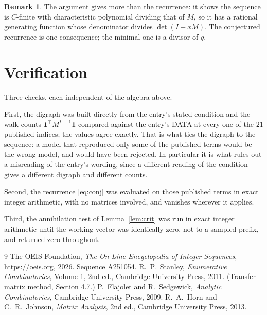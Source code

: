 \documentclass[11pt,a4paper]{article}
\theoremstyle{plain}
\theoremstyle{definition}
\newtheorem{remark}[theorem]{Remark}
\begin{document}
\begin{remark}
The argument gives more than the recurrence: it shows the sequence is $C$-finite with
characteristic polynomial dividing that of $M$, so it has a rational generating function
whose denominator divides $\det(I-xM)$. The conjectured recurrence is one consequence; the
minimal one is a divisor of $q$.
\end{remark}

\section{Verification}

Three checks, each independent of the algebra above.

First, the digraph was built directly from the entry's stated condition and the walk counts
$\mathbf{1}^{\!\top}M^{L-1}\mathbf{1}$ compared against the entry's DATA at
every one of the $21$ published indices; the values agree exactly. That is what ties
the digraph to the sequence: a model that reproduced only some of the published terms would
be the wrong model, and would have been rejected. In particular it is what rules out a
misreading of the entry's wording, since a different reading of the condition gives a
different digraph and different counts.

Second, the recurrence \eqref{eq:conj} was evaluated on those published terms in exact
integer arithmetic, with no matrices involved, and vanishes wherever it applies.

Third, the annihilation test of Lemma~\ref{lem:crit} was run in exact integer arithmetic
until the working vector was identically zero, not to a sampled prefix, and returned zero
throughout.

\begin{thebibliography}{9}
 The OEIS Foundation, \emph{The On-Line Encyclopedia of Integer
Sequences}, \url{https://oeis.org}, 2026. Sequence A251054.
 R.~P.~Stanley, \emph{Enumerative Combinatorics}, Volume 1, 2nd ed.,
Cambridge University Press, 2011. (Transfer-matrix method, Section 4.7.)
 P.~Flajolet and R.~Sedgewick, \emph{Analytic Combinatorics}, Cambridge
University Press, 2009.
 R.~A.~Horn and C.~R.~Johnson, \emph{Matrix Analysis}, 2nd ed., Cambridge
University Press, 2013.
\end{thebibliography}
\end{document}
